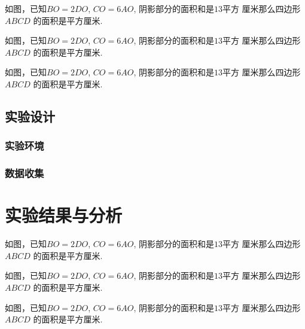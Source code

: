 \documentclass{USTBBook}
\begin{document}
\begin{question}
  如图，已知$BO=2DO$, $CO=6AO$, 阴影部分的面积和是$13$平方
  厘米那么四边形 $ABCD$ 的面积是\fillin[]平方厘米.
\end{question}

\begin{question}
  如图，已知$BO=2DO$, $CO=6AO$, 阴影部分的面积和是$13$平方
  厘米那么四边形 $ABCD$ 的面积是\fillin[]平方厘米.
\end{question}

\begin{solution}
  如图，已知$BO=2DO$, $CO=6AO$, 阴影部分的面积和是$13$平方
  厘米那么四边形 $ABCD$ 的面积是\fillin[]平方厘米.
\end{solution}

\section{实验设计}
\zhlipsum[11]

\subsection{实验环境}
\zhlipsum[12]

\subsection{数据收集}
\zhlipsum[13]

\chapter{实验结果与分析}
\zhlipsum[14]


\begin{question*}
  如图，已知$BO=2DO$, $CO=6AO$, 阴影部分的面积和是$13$平方
  厘米那么四边形 $ABCD$ 的面积是\fillin[]平方厘米.
\end{question*}

\begin{question*}
  如图，已知$BO=2DO$, $CO=6AO$, 阴影部分的面积和是$13$平方
  厘米那么四边形 $ABCD$ 的面积是\fillin[]平方厘米.
\end{question*}

\begin{question*}
  如图，已知$BO=2DO$, $CO=6AO$, 阴影部分的面积和是$13$平方
  厘米那么四边形 $ABCD$ 的面积是\fillin[]平方厘米.
\end{question*}
\end{document}
